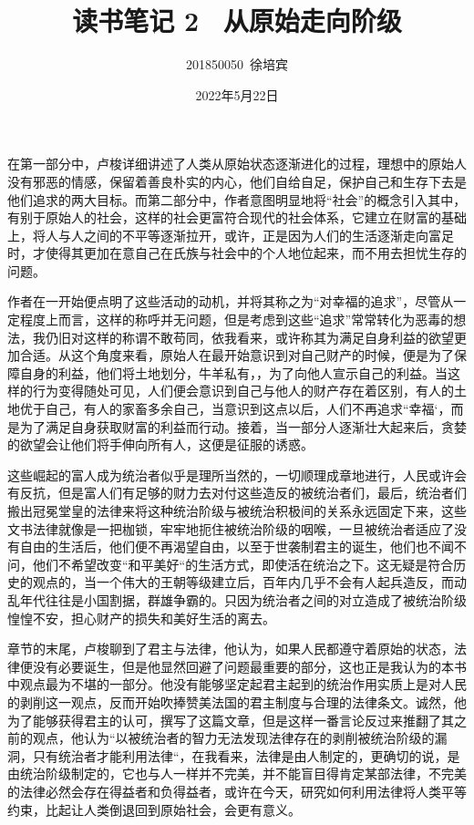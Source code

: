 \documentclass[UTF8]{article}
\title{读书笔记 2 \ 从原始走向阶级}
\author{201850050\ 徐培宾}
\date{2022年5月22日}
\begin{document}
    \maketitle

    在第一部分中，卢梭详细讲述了人类从原始状态逐渐进化的过程，理想中的原始人没有邪恶的情感，保留着善良朴实的内心，他们自给自足，保护自己和生存下去是他们追求的两大目标。而第二部分中，作者意图明显地将“社会”的概念引入其中，有别于原始人的社会，这样的社会更富符合现代的社会体系，它建立在财富的基础上，将人与人之间的不平等逐渐拉开，或许，正是因为人们的生活逐渐走向富足时，才使得其更加在意自己在氏族与社会中的个人地位起来，而不用去担忧生存的问题。

    作者在一开始便点明了这些活动的动机，并将其称之为“对幸福的追求”，尽管从一定程度上而言，这样的称呼并无问题，但是考虑到这些“追求”常常转化为恶毒的想法，我仍旧对这样的称谓不敢苟同，依我看来，或许称其为满足自身利益的欲望更加合适。从这个角度来看，原始人在最开始意识到对自己财产的时候，便是为了保障自身的利益，他们将土地划分，牛羊私有，，为了向他人宣示自己的利益。当这样的行为变得随处可见，人们便会意识到自己与他人的财产存在着区别，有人的土地优于自己，有人的家畜多余自己，当意识到这点以后，人们不再追求“幸福‘，而是为了满足自身获取财富的利益而行动。接着，当一部分人逐渐壮大起来后，贪婪的欲望会让他们将手伸向所有人，这便是征服的诱惑。

    这些崛起的富人成为统治者似乎是理所当然的，一切顺理成章地进行，人民或许会有反抗，但是富人们有足够的财力去对付这些造反的被统治者们，最后，统治者们搬出冠冕堂皇的法律来将这种统治阶级与被统治积极间的关系永远固定下来，这些文书法律就像是一把枷锁，牢牢地扼住被统治阶级的咽喉，一旦被统治者适应了没有自由的生活后，他们便不再渴望自由，以至于世袭制君主的诞生，他们也不闻不问，他们不希望改变“和平美好“的生活方式，即使活在统治之下。这无疑是符合历史的观点的，当一个伟大的王朝等级建立后，百年内几乎不会有人起兵造反，而动乱年代往往是小国割据，群雄争霸的。只因为统治者之间的对立造成了被统治阶级惶惶不安，担心财产的损失和美好生活的离去。

    章节的末尾，卢梭聊到了君主与法律，他认为，如果人民都遵守着原始的状态，法律便没有必要诞生，但是他显然回避了问题最重要的部分，这也正是我认为的本书中观点最为不堪的一部分。他没有能够坚定起君主起到的统治作用实质上是对人民的剥削这一观点，反而开始吹捧赞美法国的君主制度与合理的法律条文。诚然，他为了能够获得君主的认可，撰写了这篇文章，但是这样一番言论反过来推翻了其之前的观点，他认为“以被统治者的智力无法发现法律存在的剥削被统治阶级的漏洞，只有统治者才能利用法律“，在我看来，法律是由人制定的，更确切的说，是由统治阶级制定的，它也与人一样并不完美，并不能盲目得肯定某部法律，不完美的法律必然会存在得益者和负得益者，或许在今天，研究如何利用法律将人类平等约束，比起让人类倒退回到原始社会，会更有意义。
\end{document}
